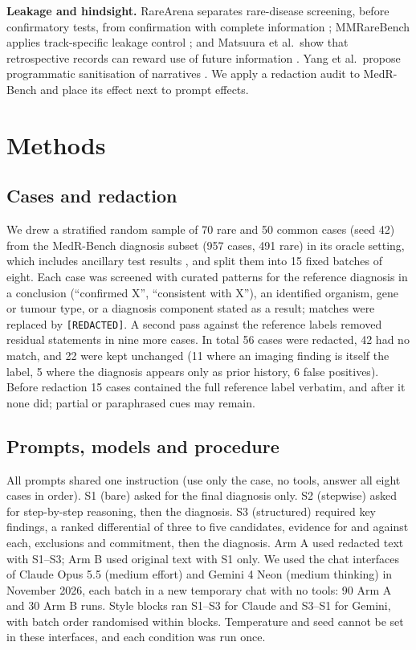 \IfFileExists{IEEEtran.cls}{\ieeetrue\documentclass[conference]{IEEEtran}}{\ieeefalse\documentclass[10pt,twocolumn,letterpaper]{article}}
\begin{document}
\textbf{Leakage and hindsight.} RareArena separates rare-disease screening, before confirmatory tests, from confirmation with complete information \cite{chen2026}; MMRareBench applies track-specific leakage control \cite{ning2026}; and Matsuura et al.\ show that retrospective records can reward use of future information \cite{matsuura2026}. Yang et al.\ propose programmatic sanitisation of narratives \cite{yang2026}. We apply a redaction audit to MedR-Bench and place its effect next to prompt effects.

\section{Methods}
\subsection{Cases and redaction}
We drew a stratified random sample of 70 rare and 50 common cases (seed 42) from the MedR-Bench diagnosis subset (957 cases, 491 rare) in its oracle setting, which includes ancillary test results \cite{qiu2025}, and split them into 15 fixed batches of eight. Each case was screened with curated patterns for the reference diagnosis in a conclusion (``confirmed X'', ``consistent with X''), an identified organism, gene or tumour type, or a diagnosis component stated as a result; matches were replaced by \texttt{[REDACTED]}. A second pass against the reference labels removed residual statements in nine more cases. In total 56 cases were redacted, 42 had no match, and 22 were kept unchanged (11 where an imaging finding is itself the label, 5 where the diagnosis appears only as prior history, 6 false positives). Before redaction 15 cases contained the full reference label verbatim, and after it none did; partial or paraphrased cues may remain.

\subsection{Prompts, models and procedure}
All prompts shared one instruction (use only the case, no tools, answer all eight cases in order). S1 (bare) asked for the final diagnosis only. S2 (stepwise) asked for step-by-step reasoning, then the diagnosis. S3 (structured) required key findings, a ranked differential of three to five candidates, evidence for and against each, exclusions and commitment, then the diagnosis. Arm A used redacted text with S1--S3; Arm B used original text with S1 only. We used the chat interfaces of Claude Opus 5.5 (medium effort) and Gemini 4 Neon (medium thinking) in November 2026, each batch in a new temporary chat with no tools: 90 Arm A and 30 Arm B runs. Style blocks ran S1--S3 for Claude and S3--S1 for Gemini, with batch order randomised within blocks. Temperature and seed cannot be set in these interfaces, and each condition was run once.
\end{document}
